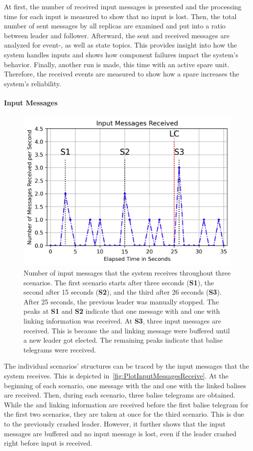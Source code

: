 At first, the number of received input messages is presented and the processing time for each input is measured to show that no input is lost.
Then, the total number of sent messages by all replicas are examined and put into a ratio between leader and follower.
Afterward, the sent and received messages are analyzed for event-, as well as state topics.
This provides insight into how the system handles inputs and shows how component failures impact the system's behavior.
Finally, another run is made, this time with an active spare unit.
Therefore, the received events are measured to show how a spare increases the system's reliability.

\paragraph{Input Messages}

\begin{figure}[!hb]
	\centering
	\includegraphics[width=0.8\linewidth]{images/plots/InputMessagesReceive}
	\caption{Number of input messages that the system receives throughout three scenarios. The first scenario starts after three seconds (\textbf{S1}), the second after 15 seconds (\textbf{S2}), and the third after 26 seconds (\textbf{S3}). After 25 seconds, the previous leader was manually stopped. The peaks at \textbf{S1} and \textbf{S2} indicate that one message with  and one with linking information was received. At \textbf{S3}, three input messages are received. This is because the  and linking message were buffered until a new leader got elected. The remaining peaks indicate that balise telegrams were received.}
	\label{fig:PlotInputMessagesReceive}
\end{figure}

The individual scenarios' structures can be traced by the input messages that the system receives.
This is depicted in~\autoref{fig:PlotInputMessagesReceive}.
At the beginning of each scenario, one message with the  and one with the linked balises are received.
Then, during each scenario, three balise telegrams are obtained.
While the  and linking information are received before the first balise telegram for the first two scenarios, they are taken at once for the third scenario.
This is due to the previously crashed leader.
However, it further shows that the input messages are buffered and no input message is lost, even if the leader crashed right before input is received.
\\

